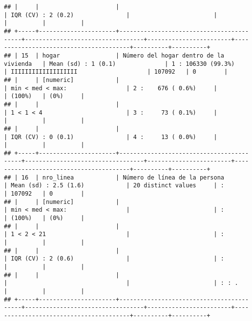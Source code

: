 \documentclass[]{article}
\begin{document}
\begin{verbatim}
## |     |                      |                                          | IQR (CV) : 2 (0.2)               |                        |                                        |          |          |
## +-----+----------------------+------------------------------------------+----------------------------------+------------------------+----------------------------------------+----------+----------+
## | 15  | hogar                | Número del hogar dentro de la vivienda   | Mean (sd) : 1 (0.1)              | 1 : 106330 (99.3%)     | IIIIIIIIIIIIIIIIIII                    | 107092   | 0        |
## |     | [numeric]            |                                          | min < med < max:                 | 2 :    676 ( 0.6%)     |                                        | (100%)   | (0%)     |
## |     |                      |                                          | 1 < 1 < 4                        | 3 :     73 ( 0.1%)     |                                        |          |          |
## |     |                      |                                          | IQR (CV) : 0 (0.1)               | 4 :     13 ( 0.0%)     |                                        |          |          |
## +-----+----------------------+------------------------------------------+----------------------------------+------------------------+----------------------------------------+----------+----------+
## | 16  | nro_linea            | Número de línea de la persona            | Mean (sd) : 2.5 (1.6)            | 20 distinct values     | :                                      | 107092   | 0        |
## |     | [numeric]            |                                          | min < med < max:                 |                        | :                                      | (100%)   | (0%)     |
## |     |                      |                                          | 1 < 2 < 21                       |                        | :                                      |          |          |
## |     |                      |                                          | IQR (CV) : 2 (0.6)               |                        | :                                      |          |          |
## |     |                      |                                          |                                  |                        | : : .                                  |          |          |
## +-----+----------------------+------------------------------------------+----------------------------------+------------------------+----------------------------------------+----------+----------+

\end{verbatim}
\end{document}
